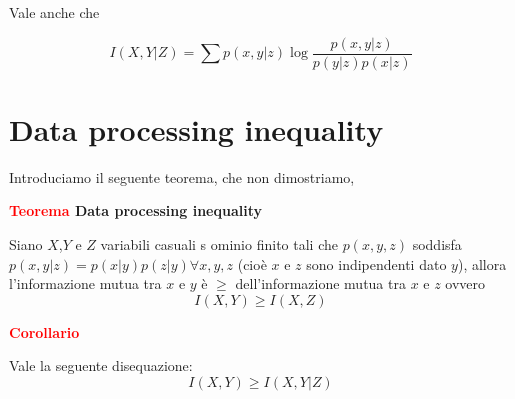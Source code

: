 \documentclass[12pt]{report}
\begin{document}
    \begin{center}

    \end{center}
    Vale anche che

    $$I(X,Y|Z) = \sum p(x,y|z) \log{\frac{p(x,y|z)}{p(y|z) p(x|z)}}$$



    \section{Data processing inequality}
    Introduciamo il seguente teorema, che non dimostriamo,

    \vspace{5px}
    \begin{tcolorbox}
        \textbf{\textcolor{red}{Teorema} Data processing inequality}
        \vspace{5px}
        \begin{center}

            Siano $X$,$Y$ e $Z$ variabili casuali s ominio finito tali che $p(x,y,z)$ soddisfa $p(x,y|z) = p(x|y) p(z|y) \forall x,y,z$ (cioè $x$ e $z$ sono indipendenti dato $y$), allora l'informazione mutua tra $x$ e $y$ è $\geq$ dell'informazione mutua tra $x$ e $z$ ovvero
            $$I(X,Y) \geq I(X,Z)$$

        \end{center}
    \end{tcolorbox}

    \vspace{5px}
    \begin{tcolorbox}
        \textbf{\textcolor{red}{Corollario} }
        \begin{center}
            Vale la seguente disequazione:
            $$I(X,Y) \geq I(X,Y|Z)$$
        \end{center}
    \end{tcolorbox}
\end{document}
